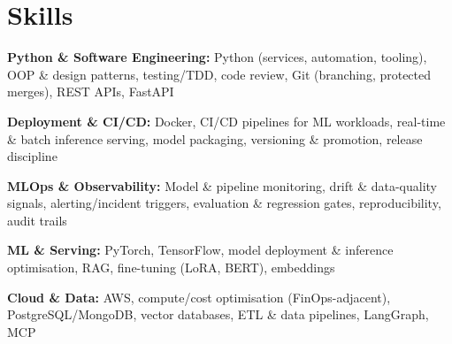 \documentclass[10pt,a4paper]{article}
\begin{document}
\section{Skills}
\begin{tight}
  \item[\textcolor{accent}{\small$\bullet$}] \textbf{Python \& Software Engineering:} Python (services, automation, tooling), OOP \& design patterns, testing/TDD, code review, Git (branching, protected merges), REST APIs, FastAPI
  \item[\textcolor{accent}{\small$\bullet$}] \textbf{Deployment \& CI/CD:} Docker, CI/CD pipelines for ML workloads, real-time \& batch inference serving, model packaging, versioning \& promotion, release discipline
  \item[\textcolor{accent}{\small$\bullet$}] \textbf{MLOps \& Observability:} Model \& pipeline monitoring, drift \& data-quality signals, alerting/incident triggers, evaluation \& regression gates, reproducibility, audit trails
  \item[\textcolor{accent}{\small$\bullet$}] \textbf{ML \& Serving:} PyTorch, TensorFlow, model deployment \& inference optimisation, RAG, fine-tuning (LoRA, BERT), embeddings
  \item[\textcolor{accent}{\small$\bullet$}] \textbf{Cloud \& Data:} AWS, compute/cost optimisation (FinOps-adjacent), PostgreSQL/MongoDB, vector databases, ETL \& data pipelines, LangGraph, MCP
\end{tight}

\end{document}
